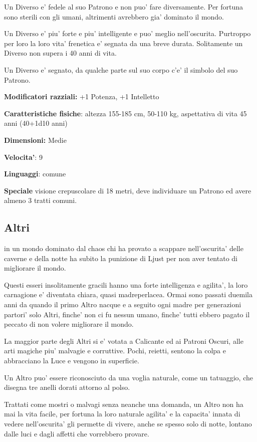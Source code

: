 \documentclass[a4paper,11pt,twoside,openany]{book}
\begin{document}
Un Diverso e' fedele al suo Patrono e non puo' fare diversamente. Per fortuna sono sterili con gli umani, altrimenti avrebbero gia' dominato il mondo.

Un Diverso e' piu' forte e piu' intelligente e puo' meglio nell'oscurita. Purtroppo per loro la loro vita' frenetica e' segnata da una breve durata. Solitamente un Diverso non supera i 40 anni di vita.

Un Diverso e' segnato, da qualche parte sul suo corpo c'e' il simbolo del suo Patrono.

\textbf{Modificatori razziali:} +1 Potenza, +1 Intelletto

\textbf{Caratteristiche fisiche}: altezza 155-185 cm, 50-110 kg, aspettativa di vita 45 anni (40+1d10 anni)

\textbf{Dimensioni:} Medie

\textbf{Velocita'}: 9

\textbf{Linguaggi}: comune

\textbf{Speciale} visione crepuscolare di 18 metri, deve individuare un Patrono ed avere almeno 3 tratti comuni.

\subsection{Altri}

\label{altri}

in un mondo dominato dal chaos chi ha provato a scappare nell'oscurita' delle caverne e della notte ha subito la punizione di Ljust per non aver tentato di migliorare il mondo.

Questi esseri insolitamente gracili hanno una forte intelligenza e agilita', la loro carnagione e' diventata chiara, quasi madreperlacea. Ormai sono passati duemila anni da quando il primo Altro nacque e a seguito ogni madre per generazioni partori' solo Altri, finche' non ci fu nessun umano, finche' tutti ebbero pagato il peccato di non volere migliorare il mondo.

La maggior parte degli Altri si e' votata a Calicante ed ai Patroni Oscuri, alle arti magiche piu' malvagie e corruttive. Pochi, reietti, sentono la colpa e abbracciano la Luce e vengono in superficie.

Un Altro puo' essere riconosciuto da una voglia naturale, come un tatuaggio, che disegna tre anelli dorati attorno al polso.

Trattati come mostri o malvagi senza neanche una domanda, un Altro non ha mai la vita facile, per fortuna la loro naturale agilita' e la capacita' innata di vedere nell'oscurita' gli permette di vivere, anche se spesso solo di notte, lontano dalle luci e dagli affetti che vorrebbero provare.
\end{document}
